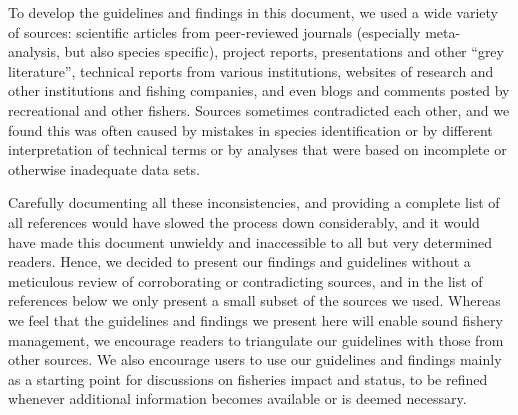 To develop the guidelines and findings in this document, we used a wide variety of sources: scientific articles from peer-reviewed journals (especially meta-analysis, but also species specific), project reports, presentations and other ``grey literature'', technical reports from various institutions, websites of research and other institutions and fishing companies, and even blogs and comments posted by recreational and other fishers. Sources sometimes contradicted each other, and we found this was often caused by mistakes in species identification or by different interpretation of technical terms or by analyses that were based on incomplete or otherwise inadequate data sets.

Carefully documenting all these inconsistencies, and providing a complete list of all references would have slowed the process down considerably, and it would have made this document unwieldy and inaccessible to all but very determined readers. Hence, we decided to present our findings and guidelines without a meticulous review of corroborating or contradicting sources, and in the list of references below we only present a small subset of the sources we used. Whereas we feel that the guidelines and findings we present here will enable sound fishery management, we encourage readers to triangulate our guidelines with those from other sources. We also encourage users to use our guidelines and findings mainly as a starting point for discussions on fisheries impact and status, to be refined whenever additional information becomes available or is deemed necessary.

